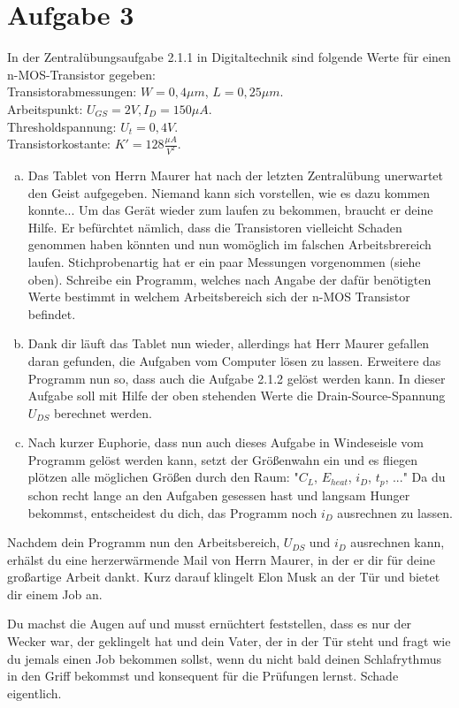 \documentclass{standalone}
\begin{document}
\section{Aufgabe 3}
    In der Zentralübungsaufgabe 2.1.1 in Digitaltechnik sind folgende Werte für einen 
    n-MOS-Transistor gegeben: \\
    Transistorabmessungen: $W = 0,4\mu m$, $L = 0,25\mu m$.\\
    Arbeitspunkt: $U_{GS} = 2V, I_D = 150\mu A$.\\
    Thresholdspannung: $U_t = 0,4V$.\\
    Transistorkostante: $K' = 128 \frac{\mu A}{V^2}$.

\begin{enumerate}[a)]
\item
    Das Tablet von Herrn Maurer hat nach der letzten Zentralübung unerwartet den Geist aufgegeben. Niemand
    kann sich vorstellen, wie es dazu kommen konnte...  Um das Gerät wieder zum laufen zu bekommen, braucht er deine Hilfe. 
    Er befürchtet nämlich, dass die Transistoren vielleicht Schaden genommen haben könnten und nun womöglich im falschen Arbeitsbrereich laufen.
    Stichprobenartig hat er ein paar Messungen vorgenommen (siehe oben). Schreibe ein Programm, welches nach Angabe der dafür benötigten 
    Werte bestimmt in welchem Arbeitsbereich sich der n-MOS Transistor befindet. 
    
\item 
    Dank dir läuft das Tablet nun wieder, allerdings hat Herr Maurer gefallen daran gefunden, die Aufgaben vom Computer lösen zu lassen.
    Erweitere das Programm nun so, dass auch die Aufgabe 2.1.2 gelöst werden kann. In dieser Aufgabe soll mit Hilfe der oben stehenden Werte
    die Drain-Source-Spannung $U_{DS}$ berechnet werden.

\item
    Nach kurzer Euphorie, dass nun auch dieses Aufgabe in Windeseisle vom Programm gelöst werden kann, setzt der Größenwahn ein und es fliegen
    plötzen alle möglichen Größen durch den Raum:
    "$C_L$, $E_{heat}$, $i_D$, $t_p$, ..."
    Da du schon recht lange an den Aufgaben gesessen hast und langsam Hunger bekommst, entscheidest du dich, das Programm noch $i_D$ ausrechnen zu lassen.

\end{enumerate}

Nachdem dein Programm nun den Arbeitsbereich, $U_{DS}$ und $i_D$ ausrechnen kann, erhälst du eine herzerwärmende Mail von Herrn Maurer, in der er dir 
für deine großartige Arbeit dankt. Kurz darauf klingelt Elon Musk an der Tür und bietet dir einem Job an.

Du machst die Augen auf und musst ernüchtert feststellen, dass es nur der Wecker war, der geklingelt hat und dein Vater, der in der Tür steht und fragt wie du 
jemals einen Job bekommen sollst, wenn du nicht bald deinen Schlafrythmus in den Griff bekommst und konsequent für die Prüfungen lernst.
Schade eigentlich.
\end{document}
